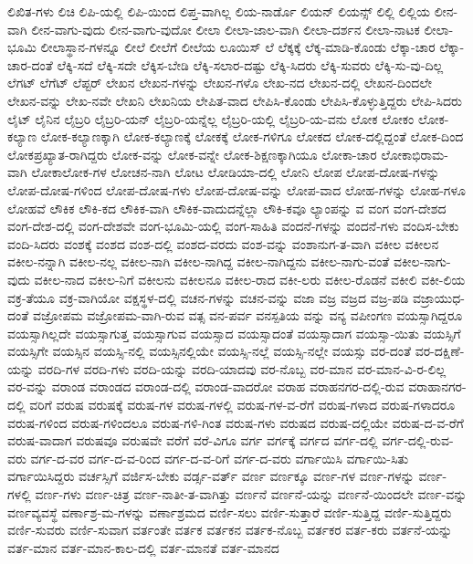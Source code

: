 {ಲಿಖಿತ-ಗಳು
ಲಿಚಿ
ಲಿಪಿ-ಯಲ್ಲಿ
ಲಿಪಿ-ಯಿಂದ
ಲಿಪ್ತ-ವಾಗಿಲ್ಲ
ಲಿಯ-ನಾರ್ಡೊ
ಲಿಯನ್
ಲಿಯನ್ಸ್
ಲಿಲ್ಲಿ
ಲಿಲ್ಲಿಯ
ಲೀನ-ವಾಗಿ
ಲೀನ-ವಾಗು-ವುದು
ಲೀನ-ವಾಗು-ವುದೋ
ಲೀಲಾ
ಲೀಲಾ-ಜಾಲ-ವಾಗಿ
ಲೀಲಾ-ದರ್ಶನ
ಲೀಲಾ-ನಾಟಕ
ಲೀಲಾ-ಭೂಮಿ
ಲೀಲಾಸ್ಥಾನ-ಗಳನ್ನೂ
ಲೀಲೆ
ಲೀಲೆಗೆ
ಲೀಲೆಯ
ಲೂಯಿಸ್
ಲೆ
ಲೆಕ್ಕಕ್ಕೆ
ಲೆಕ್ಕ-ಮಾಡಿ-ಕೊಂಡು
ಲೆಕ್ಕಾ-ಚಾರ
ಲೆಕ್ಕಾ-ಚಾರ-ದಂತೆ
ಲೆಕ್ಕಿ-ಸದೆ
ಲೆಕ್ಕಿ-ಸದೇ
ಲೆಕ್ಕಿಸ-ಬೇಡಿ
ಲೆಕ್ಕಿ-ಸಲಾರ-ದಷ್ಟು
ಲೆಕ್ಕಿ-ಸಿದರು
ಲೆಕ್ಕಿ-ಸುವರು
ಲೆಕ್ಕಿ-ಸು-ವು-ದಿಲ್ಲ
ಲೆಗಟ್
ಲೆಗೆಟ್
ಲೆಪ್ಟರ್
ಲೇಖನ
ಲೇಖನ-ಗಳನ್ನು
ಲೇಖನ-ಗಳೊ
ಲೇಖ-ನದ
ಲೇಖನ-ದಲ್ಲಿ
ಲೇಖನ-ದಿಂದಲೇ
ಲೇಖನ-ವನ್ನು
ಲೇಖ-ನವೇ
ಲೇಖನಿ
ಲೇಖನಿಯ
ಲೇಪಿತ-ವಾದ
ಲೇಪಿಸಿ-ಕೊಂಡು
ಲೇಪಿಸಿ-ಕೊಳ್ಳುತ್ತಿದ್ದರು
ಲೇಪಿ-ಸಿದರು
ಲೈಟ್
ಲೈನಿನ
ಲೈಬ್ರರಿ
ಲೈಬ್ರರಿ-ಯನ್
ಲೈಬ್ರರಿ-ಯನ್ನೆಲ್ಲ
ಲೈಬ್ರರಿ-ಯಲ್ಲಿ
ಲೈಬ್ರರಿ-ಯ-ವನು
ಲೋಕ
ಲೋಕಂ
ಲೋಕ-ಕಲ್ಯಾಣ
ಲೋಕ-ಕಲ್ಯಾಣಕ್ಕಾಗಿ
ಲೋಕ-ಕಲ್ಯಾಣಕ್ಕೆ
ಲೋಕಕ್ಕೆ
ಲೋಕ-ಗಳಿಗೂ
ಲೋಕದ
ಲೋಕ-ದಲ್ಲಿದ್ದಂತೆ
ಲೋಕ-ದಿಂದ
ಲೋಕಪ್ರಖ್ಯಾತ-ರಾಗಿದ್ದರು
ಲೋಕ-ವನ್ನು
ಲೋಕ-ವನ್ನೇ
ಲೋಕ-ಶಿಕ್ಷಣಕ್ಕಾಗಿಯೂ
ಲೋಕಾ-ಚಾರ
ಲೋಕಾಭಿರಾಮ-ವಾಗಿ
ಲೋಕಾಲೋಕ-ಗಳ
ಲೋಚನ-ನಾಗಿ
ಲೋಟ
ಲೋಡಿಯಾ-ದಲ್ಲಿ
ಲೋನಿ
ಲೋಪ
ಲೋಪ-ದೋಷ-ಗಳನ್ನು
ಲೋಪ-ದೋಷ-ಗಳಿಂದ
ಲೋಪ-ದೋಷ-ಗಳು
ಲೋಪ-ದೋಷ-ವನ್ನು
ಲೋಪ-ವಾದ
ಲೋಹ-ಗಳನ್ನು
ಲೋಹ-ಗಳೂ
ಲೋಹವೆ
ಲೌಕಿಕ
ಲೌಕಿ-ಕದ
ಲೌಕಿಕ-ವಾಗಿ
ಲೌಕಿಕ-ವಾದುದನ್ನೆಲ್ಲಾ
ಲೌಕಿ-ಕವೂ
ಲ್ಯಾಂಪನ್ನು
ವ
ವಂಗ
ವಂಗ-ದೇಶದ
ವಂಗ-ದೇಶ-ದಲ್ಲಿ
ವಂಗ-ದೇಶವೇ
ವಂಗ-ಭೂಮಿ-ಯಲ್ಲಿ
ವಂಗ-ಸಾಹಿತಿ
ವಂದನೆ-ಗಳನ್ನು
ವಂದನೆ-ಗಳು
ವಂದಿಸ-ಬೇಕು
ವಂದಿ-ಸಿದರು
ವಂಶಕ್ಕೆ
ವಂಶದ
ವಂಶ-ದಲ್ಲಿ
ವಂಶದ-ವರದು
ವಂಶ-ವನ್ನು
ವಂಶಾನುಗ-ತ-ವಾಗಿ
ವಕೀಲ
ವಕೀಲನ
ವಕೀಲ-ನನ್ನಾಗಿ
ವಕೀಲ-ನಲ್ಲ
ವಕೀಲ-ನಾಗಿ
ವಕೀಲ-ನಾಗಿದ್ದ
ವಕೀಲ-ನಾಗಿದ್ದನು
ವಕೀಲ-ನಾಗು-ವಂತೆ
ವಕೀಲ-ನಾಗು-ವುದು
ವಕೀಲ-ನಾದ
ವಕೀಲ-ನಿಗೆ
ವಕೀಲನು
ವಕೀಲನೂ
ವಕೀಲ-ರಾದ
ವಕೀ-ಲರು
ವಕೀಲ-ರೊಡನೆ
ವಕೀಲಿ
ವಕೀ-ಲಿಯ
ವಕ್ರ-ತೆಯೂ
ವಕ್ರ-ವಾಗಿಯೋ
ವಕ್ಷಸ್ಥಳ-ದಲ್ಲಿ
ವಚನ-ಗಳನ್ನು
ವಚನ-ವನ್ನು
ವಜಾ
ವಜ್ರ
ವಜ್ರದ
ವಜ್ರ-ಪಡಿ
ವಜ್ರಾಯುಧ-ದಂತೆ
ವಜ್ರೋಪಮ
ವಜ್ರೋಪಮ-ವಾಗಿ-ರುವ
ವತ್ಸ
ವನ-ಪರ್ವ
ವನಸ್ಪತಿಯ
ವನ್ನು
ವನ್ಯ
ವಪೀಂಗಣ
ವಯಸ್ಸಾಗಿದ್ದರೂ
ವಯಸ್ಸಾಗಿಲ್ಲದೇ
ವಯಸ್ಸಾಗುತ್ತ
ವಯಸ್ಸಾಗುವ
ವಯಸ್ಸಾದ
ವಯಸ್ಸಾದಂತೆ
ವಯಸ್ಸಾದಾಗ
ವಯಸ್ಸಾ-ಯಿತು
ವಯಸ್ಸಿಗೆ
ವಯಸ್ಸಿಗೇ
ವಯಸ್ಸಿನ
ವಯಸ್ಸಿ-ನಲ್ಲಿ
ವಯಸ್ಸಿನಲ್ಲಿಯೇ
ವಯಸ್ಸಿ-ನಲ್ಲೆ
ವಯಸ್ಸಿ-ನಲ್ಲೇ
ವಯಸ್ಸು
ವರ-ದಂತೆ
ವರ-ದಕ್ಷಿಣೆ-ಯನ್ನು
ವರದಿ-ಗಳ
ವರದಿ-ಗಳು
ವರದಿ-ಯನ್ನು
ವರದಿ-ಯಾದವು
ವರ-ನೊಬ್ಬ
ವರ-ಮಾನ
ವರ-ಮಾನ-ವಿ-ರ-ಲಿಲ್ಲ
ವರ-ವನ್ನು
ವರಾಂಡ
ವರಾಂಡದ
ವರಾಂಡ-ದಲ್ಲಿ
ವರಾಂಡ-ವಾದರೋ
ವರಾಹ
ವರಾಹನಗರ-ದಲ್ಲಿ-ರುವ
ವರಾಹಾನಗರ-ದಲ್ಲಿ
ವರಿಗೆ
ವರುಷ
ವರುಷಕ್ಕೆ
ವರುಷ-ಗಳ
ವರುಷ-ಗಳಲ್ಲಿ
ವರುಷ-ಗಳ-ವ-ರೆಗೆ
ವರುಷ-ಗಳಾದ
ವರುಷ-ಗಳಾದರೂ
ವರುಷ-ಗಳಿಂದ
ವರುಷ-ಗಳಿಂದಲೂ
ವರುಷ-ಗಳಿ-ಗಿಂತ
ವರುಷ-ಗಳು
ವರುಷದ
ವರುಷ-ದಲ್ಲಿಯೇ
ವರುಷ-ದ-ವ-ರೆಗೆ
ವರುಷ-ವಾದಾಗ
ವರುಷವೂ
ವರುಷವೇ
ವರೆಗೆ
ವರೆ-ವಿಗೂ
ವರ್ಗ
ವರ್ಗಕ್ಕೆ
ವರ್ಗದ
ವರ್ಗ-ದಲ್ಲಿ
ವರ್ಗ-ದಲ್ಲಿ-ರುವ-ವರು
ವರ್ಗ-ದ-ವರ
ವರ್ಗ-ದ-ವ-ರಿಂದ
ವರ್ಗ-ದ-ವ-ರಿಗೆ
ವರ್ಗ-ದ-ವರು
ವರ್ಗಾಯಿಸಿ
ವರ್ಗಾಯಿ-ಸಿತು
ವರ್ಗಾಯಿಸಿದ್ದರು
ವರ್ಚಸ್ಸಿಗೆ
ವರ್ಜಿಸ-ಬೇಕು
ವರ್ಡ್ಸ-ವರ್ತ್
ವರ್ಣ
ವರ್ಣಕ್ಕೂ
ವರ್ಣ-ಗಳ
ವರ್ಣ-ಗಳನ್ನು
ವರ್ಣ-ಗಳಲ್ಲಿ
ವರ್ಣ-ಗಳು
ವರ್ಣ-ಚಿತ್ರ
ವರ್ಣ-ನಾತೀ-ತ-ವಾಗಿತ್ತು
ವರ್ಣನೆ
ವರ್ಣನೆ-ಯನ್ನು
ವರ್ಣನೆ-ಯಿಂದಲೇ
ವರ್ಣ-ವನ್ನು
ವರ್ಣವ್ಯವಸ್ಥೆ
ವರ್ಣಾಶ್ರ-ಮ-ಗಳನ್ನು
ವರ್ಣಾಶ್ರಮದ
ವರ್ಣಿ-ಸಲು
ವರ್ಣಿ-ಸುತ್ತಾರೆ
ವರ್ಣಿ-ಸುತ್ತಿದ್ದ
ವರ್ಣಿ-ಸುತ್ತಿದ್ದರು
ವರ್ಣಿ-ಸುವರು
ವರ್ಣಿ-ಸುವಾಗ
ವರ್ತಂತೇ
ವರ್ತಕ
ವರ್ತಕನ
ವರ್ತಕ-ನೊಬ್ಬ
ವರ್ತಕರ
ವರ್ತ-ಕರು
ವರ್ತನೆ-ಯನ್ನು
ವರ್ತ-ಮಾನ
ವರ್ತ-ಮಾನ-ಕಾಲ-ದಲ್ಲಿ
ವರ್ತ-ಮಾನತೆ
ವರ್ತ-ಮಾನದ
}
